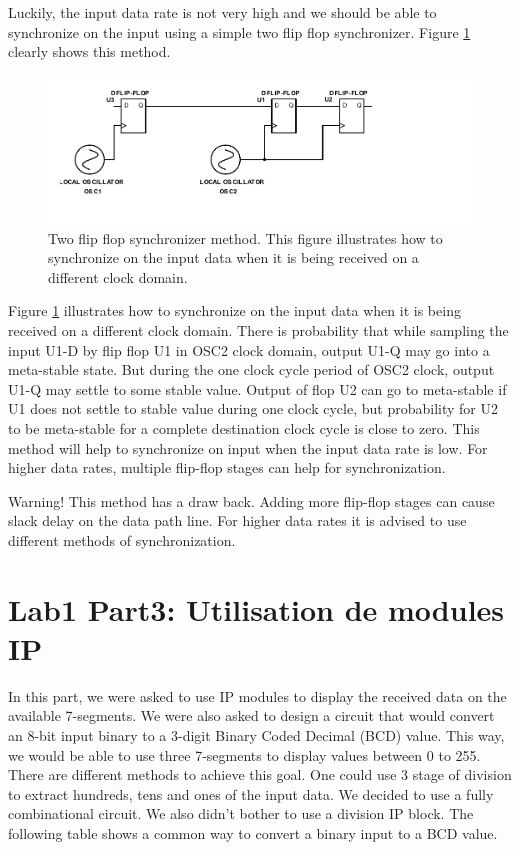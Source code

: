 \documentclass{rapportECL}
\begin{document}
Luckily, the input data rate is not very high and we should be able to synchronize on the input using a simple two flip flop synchronizer. Figure \ref{fig:2d_ff} clearly shows this method.

\begin{figure}[H]
    \centering
    \includegraphics[width=15cm]{logos/2d_FF_sync.pdf}
    \caption{Two flip flop synchronizer method. This figure illustrates how to synchronize on the input data when it is being received on a different clock domain. }
    \label{fig:2d_ff}
\end{figure}

Figure \ref{fig:2d_ff} illustrates how to synchronize on the input data when it is being received on a different clock domain. There is probability that while sampling the input U1-D by flip flop U1 in OSC2 clock domain, output U1-Q may go into a meta-stable state. But during the one clock cycle period of OSC2 clock, output U1-Q may settle to some stable value. Output of flop U2 can go to meta-stable if U1 does not settle to stable value during one clock cycle, but probability for U2 to be meta-stable for a complete destination clock cycle is close to zero. This method will help to synchronize on input when the input data rate is low. For higher data rates, multiple flip-flop stages can help for synchronization.

\begin{bclogo}[logo=\bcinfo, couleurBarre=orange, noborder=true, couleur=white]{Warning!}
This method has a draw back. Adding more flip-flop stages can cause slack delay on the data path line. For higher data rates it is advised to use different methods of synchronization.
\end{bclogo}



\section{Lab1 Part3: Utilisation de modules IP}
In this part, we were asked to use IP modules to display the received data on the available 7-segments. We were also asked to design a circuit that would convert an 8-bit input binary to a 3-digit Binary Coded Decimal (BCD) value. This way, we would be able to use three 7-segments to display values between 0 to 255.\\
There are different methods to achieve this goal. One could use 3 stage of division to extract hundreds, tens and ones of the input data. We decided to use a fully combinational circuit. We also didn't bother to use a division IP block. The following table shows a common way to convert a binary input to a BCD value.
\end{document}
